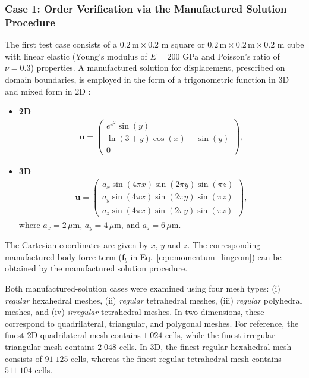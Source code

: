 \documentclass[review,3p]{elsarticle}
\newcommand{\bb}{\boldsymbol}
\begin{document}
\subsubsection{Case 1: Order Verification via the Manufactured Solution Procedure}
\label{case:mms}
%
The first test case consists of a  $0.2\,\text{m} \times 0.2$ m square or $0.2\,\text{m} \times 0.2\,\text{m} \times 0.2$ m cube with linear elastic (Young's modulus of $E = 200$ GPa and Poisson's ratio of $\nu = 0.3$) properties.
A manufactured solution for displacement, prescribed on domain boundaries, is employed in the form of a trigonometric function in 3D \cite{Mazzanti2024} and mixed form in 2D \cite{Castrillo2022}:
%
\begin{itemize}
	\item[•] \textbf{2D}
	\begin{eqnarray}
		\bb{u} =
		\begin{pmatrix}
			e^{x^2}\sin(y)\\
			\ln(3+y)\cos(x)+\sin(y)\\
			0
		\end{pmatrix},
	\end{eqnarray}
	\item[•] \textbf{3D}
	\begin{eqnarray}
		\bb{u} =
		\begin{pmatrix}
			a_x \sin(4\pi x) \sin(2\pi y) \sin(\pi z) \\
			a_y \sin(4 \pi x) \sin(2 \pi y) \sin(\pi z) \\
			a_z \sin(4 \pi x) \sin(2 \pi y) \sin(\pi z)
		\end{pmatrix},
	\end{eqnarray}
	where $a_x = 2\,\mu$m, $a_y = 4\,\mu$m, and $a_z = 6\,\mu$m.
\end{itemize}
The Cartesian coordinates are given by $x$, $y$ and $z$.
The corresponding manufactured body force term ($\bb{f}_b$ in Eq.~\eqref{eqn:momentum_lingeom}) can be obtained by the manufactured solution procedure.

Both manufactured-solution cases were examined using four mesh types: (i) \emph{regular} hexahedral meshes, (ii) \emph{regular} tetrahedral meshes, (iii) \emph{regular} polyhedral meshes, and (iv) \emph{irregular} tetrahedral meshes. In two dimensions, these correspond to quadrilateral, triangular, and polygonal meshes. For reference, the finest 2D quadrilateral mesh contains $1\;024$ cells, while the finest irregular triangular mesh contains $2\;048$ cells. In 3D, the finest regular hexahedral mesh consists of $91\;125$ cells, whereas the finest regular tetrahedral mesh contains $511\;104$ cells.
\end{document}
